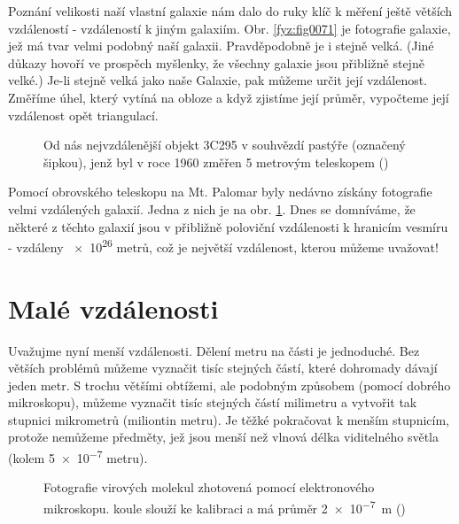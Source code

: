     Poznání velikosti naší vlastní galaxie nám dalo do ruky klíč k měření ještě větších vzdáleností 
    - vzdáleností k jiným galaxiím. Obr. \ref{fyz:fig0071} je fotografie galaxie, jež má tvar velmi 
    podobný naší galaxii. Pravděpodobně je i stejně velká. (Jiné důkazy hovoří ve prospěch 
    myšlenky, že všechny galaxie jsou přibližně stejně velké.) Je-li stejně velká jako naše 
    Galaxie, pak můžeme určit její vzdálenost. Změříme úhel, který vytíná na obloze a když zjistíme 
    její průměr, vypočteme její vzdálenost opět triangulací.

    \begin{figure}[ht!]  %
      \centering
      \caption{Od nás nejvzdálenější objekt 3C295 v souhvězdí pastýře (označený šipkou), jenž byl v 
               roce \num{1960} změřen \num{5} metrovým teleskopem (\cite[s.~73]{Feynman01})}
      \label{fyz:fig0072}
    \end{figure}
    
    Pomocí obrovského teleskopu na Mt. Palomar byly nedávno získány fotografie velmi vzdálených 
    galaxií. Jedna z nich je na obr. \ref{fyz:fig0072}. Dnes se domníváme, že některé z těchto 
    galaxií jsou v přibližně poloviční vzdálenosti k hranicím vesmíru - vzdáleny \num{e26} metrů, 
    což je největší vzdálenost, kterou můžeme uvažovat!
    
  \section{Malé vzdálenosti}
    Uvažujme nyní menší vzdálenosti. Dělení metru na části je jednoduché. Bez větších problémů 
    můžeme vyznačit tisíc stejných částí, které dohromady dávají jeden metr. S trochu většími 
    obtížemi, ale podobným způsobem (pomocí dobrého mikroskopu), můžeme vyznačit tisíc stejných 
    částí milimetru a vytvořit tak stupnici mikrometrů (miliontin metru). Je těžké pokračovat k 
    menším stupnicím, protože nemůžeme  předměty, jež jsou menší než vlnová délka 
    viditelného světla (kolem \num{5e-7} metru).

    \begin{figure}[ht!]  %
      \centering
      \caption{Fotografie virových molekul zhotovená pomocí elektronového mikroskopu.  
               koule slouží ke kalibraci a má průměr \qty{2e-7}{\m}
               (\cite[s.~74]{Feynman01})}
      \label{fyz:fig0073}
    \end{figure}
    
